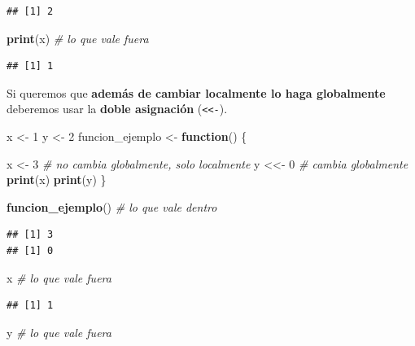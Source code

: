 \documentclass[11pt,]{book}
\newenvironment{Shaded}{\begin{snugshade}}{\end{snugshade}}
\newcommand{\CommentTok}[1]{\textcolor[rgb]{0.37,0.37,0.37}{\textit{#1}}}
\newcommand{\ControlFlowTok}[1]{\textcolor[rgb]{0.27,0.27,0.27}{\textbf{#1}}}
\newcommand{\DecValTok}[1]{\textcolor[rgb]{0.06,0.06,0.06}{#1}}
\newcommand{\KeywordTok}[1]{\textcolor[rgb]{0.27,0.27,0.27}{\textbf{#1}}}
\newcommand{\NormalTok}[1]{#1}
\newcommand{\StringTok}[1]{\textcolor[rgb]{0.5,0.5,0.5}{#1}}
\begin{document}
\begin{verbatim}
## [1] 2
\end{verbatim}

\begin{Shaded}
\begin{Highlighting}[]
\KeywordTok{print}\NormalTok{(x) }\CommentTok{# lo que vale fuera}
\end{Highlighting}
\end{Shaded}

\begin{verbatim}
## [1] 1
\end{verbatim}

Si queremos que \textbf{además de cambiar localmente lo haga globalmente} deberemos usar la \textbf{doble asignación} (\texttt{\textless{}\textless{}-}).

\begin{Shaded}
\begin{Highlighting}[]
\NormalTok{x <-}\StringTok{ }\DecValTok{1}
\NormalTok{y <-}\StringTok{ }\DecValTok{2}
\NormalTok{funcion_ejemplo <-}\StringTok{ }\ControlFlowTok{function}\NormalTok{() \{}
  
\NormalTok{  x <-}\StringTok{ }\DecValTok{3} \CommentTok{# no cambia globalmente, solo localmente}
\NormalTok{  y <<-}\StringTok{ }\DecValTok{0} \CommentTok{# cambia globalmente}
  \KeywordTok{print}\NormalTok{(x)}
  \KeywordTok{print}\NormalTok{(y)}
\NormalTok{\}}

\KeywordTok{funcion_ejemplo}\NormalTok{() }\CommentTok{# lo que vale dentro}
\end{Highlighting}
\end{Shaded}

\begin{verbatim}
## [1] 3
## [1] 0
\end{verbatim}

\begin{Shaded}
\begin{Highlighting}[]
\NormalTok{x }\CommentTok{# lo que vale fuera}
\end{Highlighting}
\end{Shaded}

\begin{verbatim}
## [1] 1
\end{verbatim}

\begin{Shaded}
\begin{Highlighting}[]
\NormalTok{y }\CommentTok{# lo que vale fuera}
\end{Highlighting}
\end{Shaded}
\end{document}
